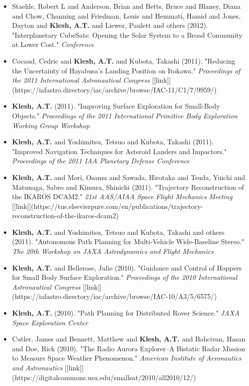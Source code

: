 \documentclass[11pt,letterpaper]{article}
\begin{document}
\begin{itemize}
\item Staehle, Robert L and Anderson, Brian and Betts, Bruce and Blaney, Diana and Chow, Channing and Friedman, Louis and Hemmati, Hamid and Jones, Dayton and \textbf{Klesh, A.T.} and Liewer, Paulett and others (2012). "Interplanetary CubeSats: Opening the Solar System to a Broad Community at Lower Cost." \textit{Conference}
\item Cocaud, Cedric and \textbf{Klesh, A.T.} and Kubota, Takashi (2011). "Reducing the Uncertainty of Hayabusa's Landing Position on Itokawa." \textit{Proceedings of the 2011 International Astronautical Congress} [[link]](https://iafastro.directory/iac/archive/browse/IAC-11/C1/7/9959/)
\item \textbf{Klesh, A.T.} (2011). "Improving Surface Exploration for Small-Body Objects." \textit{Proceedings of the 2011 International Primitive Body Exploration Working Group Workshop}
\item \textbf{Klesh, A.T.} and Yoshimitsu, Tetsuo and Kubota, Takashi (2011). "Improved Navigation Techniques for Asteroid Landers and Impactors." \textit{Proceedings of the 2011 IAA Planetary Defense Conference}
\item \textbf{Klesh, A.T.} and Mori, Osamu and Sawada, Hirotaka and Tsuda, Yuichi and Matunaga, Sabro and Kimura, Shinichi (2011). "Trajectory Reconstruction of the IKAROS DCAM2." \textit{21st AAS/AIAA Space Flight Mechanics Meeting} [[link]](https://tus.elsevierpure.com/en/publications/trajectory-reconstruction-of-the-ikaros-dcam2)
\item \textbf{Klesh, A.T.} and Yoshimitsu, Tetsuo and Kubota, Takashi and others (2011). "Autonomous Path Planning for Multi-Vehicle Wide-Baseline Stereo." \textit{The 20th Workshop on JAXA Astrodynamics and Flight Mechanics}
\item \textbf{Klesh, A.T.} and Bellerose, Julie (2010). "Guidance and Control of Hoppers for Small Body Surface Exploration." \textit{Proceedings of the 2010 International Astronautical Congress} [[link]](https://iafastro.directory/iac/archive/browse/IAC-10/A3/5/6575/)
\item \textbf{Klesh, A.T.} (2010). "Path Planning for Distributed Rover Science." \textit{JAXA Space Exploration Center}
\item Cutler, James and Bennett, Matthew and \textbf{Klesh, A.T.} and Bahcivan, Hasan and Doe, Rick (2010). "The Radio Aurora Explorer--A Bistatic Radar Mission to Measure Space Weather Phenomenon." \textit{American Institute of Aeronautics and Astronautics} [[link]](https://digitalcommons.usu.edu/smallsat/2010/all2010/12/)

\end{itemize}
\end{document}
